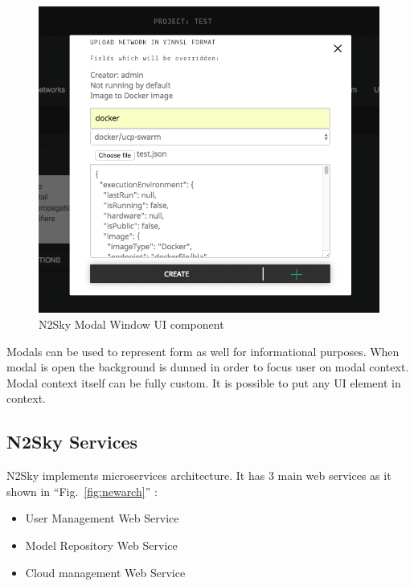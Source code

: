 \begin{description}
 \begin{figure}[htbp]
\begin{center}
  \includegraphics[scale=0.65]{components/3/components/modal.png}
  \caption{N2Sky Modal Window UI component}
  \label{fig:modal}
\end{center}
\end{figure}

Modals can be used to represent form as well for informational purposes. When modal is open the background is dunned in order to focus user on modal context. Modal context itself can be fully custom. It is possible to put any UI element in context.



\end{description}



\subsection{N2Sky Services}\label{N2Sky Services}

 N2Sky implements microservices architecture. It has 3 main web services as it shown in ``Fig.~\ref{fig:newarch}'' :
 
\begin{itemize}
\item User Management Web Service
\item Model Repository Web Service
\item Cloud management Web Service
\end{itemize}

